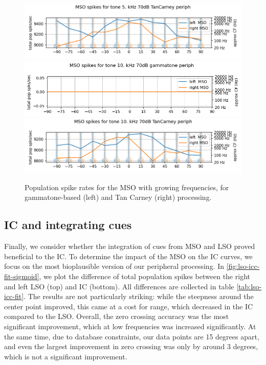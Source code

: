 \documentclass[11pt,a4paper]{article}
\begin{document}
\begin{figure}[H]
    \includegraphics[width=0.48\linewidth]{Images/mtc5000.png}
    \includegraphics[width=0.48\linewidth]{Images/gamm10000.png}
    \includegraphics[width=0.48\linewidth]{Images/mtc10000.png}
    \caption{Population spike rates for the MSO with growing frequencies, for gammatone-based (left) and Tan Carney (right) processing.}
    \label{fig:res-mso}
\end{figure}


\subsection{IC and integrating cues}
Finally, we consider whether the integration of cues from MSO and LSO proved beneficial to the IC. To determine the impact of the MSO on the IC curves, we focus on the most bioplausible version of our peripheral processing. In \ref{fig:lso-icc-fit-sigmoid}, we plot the difference of total population spikes between the right and left LSO (top) and IC (bottom). All differences are collected in table \ref{tab:lso-icc-fit}. The results are not particularly striking: while the steepness around the center point improved, this came at a cost for range, which decreased in the IC compared to the LSO. Overall, the zero crossing accuracy was the most significant improvement, which at low frequencies was increased significantly. At the same time, due to database constraints, our data points are 15 degrees apart, and even the largest improvement in zero crossing was only by around 3 degrees, which is not a significant improvement.
\end{document}
